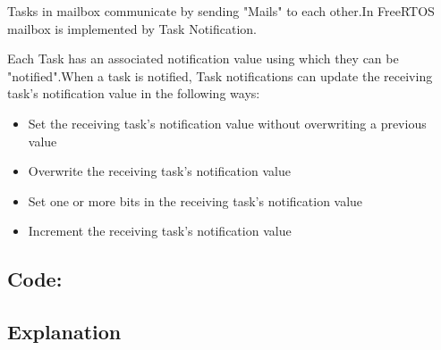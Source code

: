 \documentclass[11pt,a4paper]{book}
\begin{document}
   Tasks in mailbox communicate by sending "Mails" to each other.In FreeRTOS mailbox is implemented by Task Notification.
   
   Each Task has an associated notification value using which they can be "notified".When a task is notified, Task notifications can update the receiving task's notification value in the following ways:
   \begin{itemize}
   	 
\item Set the receiving task's notification value without overwriting a previous value
\item Overwrite the receiving task's notification value
\item Set one or more bits in the receiving task's notification value
\item Increment the receiving task's notification value 
   
   \end{itemize}
   \newpage
   \subsection{Code:}
   	
   \newpage
   
   \subsection{Explanation}
   
\end{document}
